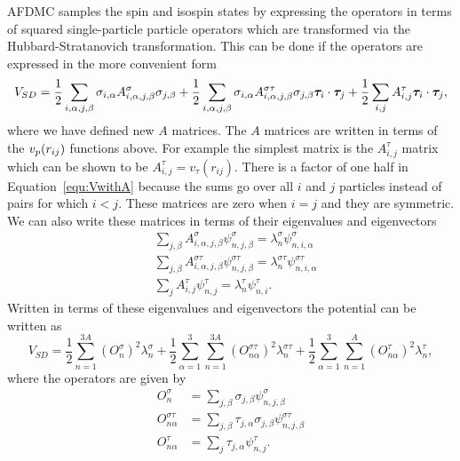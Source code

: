 AFDMC samples the spin and isospin states by expressing the operators in terms of squared single-particle particle operators which are transformed via the Hubbard-Stratanovich transformation. This can be done if the operators are expressed in the more convenient form
\begin{equation}
   V_{SD} = \frac{1}{2}\sum\limits_{i,\alpha,j,\beta} \sigma_{i,\alpha}A^{\sigma}_{i,\alpha,j,\beta}\sigma_{j,\beta}
      + \frac{1}{2}\sum\limits_{i,\alpha,j,\beta} \sigma_{i,\alpha}A^{\sigma\tau}_{i,\alpha,j,\beta}\sigma_{j,\beta}\bm{\tau}_i\cdot\bm{\tau}_j
      + \frac{1}{2}\sum\limits_{i,j} A^{\tau}_{i,j}\bm{\tau}_i\cdot\bm{\tau}_j,
   \label{equ:VwithA}
\end{equation}
where we have defined new $A$ matrices. The $A$ matrices are written in terms of the $v_p(r_{ij})$ functions above. For example the simplest matrix is the $A^{\tau}_{i,j}$ matrix which can be shown to be $A^{\tau}_{i,j} = v_{\tau}(r_{ij})$. There is a factor of one half in Equation~\ref{equ:VwithA} because the sums go over all $i$ and $j$ particles instead of pairs for which $i<j$. These matrices are zero when $i=j$ and they are symmetric. We can also write these matrices in terms of their eigenvalues and eigenvectors
\begin{align}
   &\sum\limits_{j,\beta} A^{\sigma}_{i,\alpha,j,\beta}\psi^{\sigma}_{n,j,\beta} = \lambda^{\sigma}_n\psi^{\sigma}_{n,i,\alpha} \\
   &\sum\limits_{j,\beta} A^{\sigma\tau}_{i,\alpha,j,\beta}\psi^{\sigma\tau}_{n,j,\beta} = \lambda^{\sigma\tau}_n\psi^{\sigma\tau}_{n,i,\alpha} \\
   &\sum\limits_{j} A^{\tau}_{i,j}\psi^{\tau}_{n,j} = \lambda^{\tau}_n\psi^{\tau}_{n,i}.
\end{align}
Written in terms of these eigenvalues and eigenvectors the potential can be written as
\begin{equation}
   V_{SD} = \frac{1}{2}\sum\limits_{n=1}^{3A} \left(O_{n}^{\sigma}\right)^2 \lambda_n^{\sigma}
      + \frac{1}{2}\sum\limits_{\alpha=1}^{3}\sum\limits_{n=1}^{3A} \left(O_{n\alpha}^{\sigma\tau}\right)^2 \lambda_n^{\sigma\tau}
      + \frac{1}{2}\sum\limits_{\alpha=1}^{3}\sum\limits_{n=1}^{A} \left(O_{n\alpha}^{\tau}\right)^2 \lambda_n^{\tau},
\end{equation}
where the operators are given by
\begin{equation}
\begin{split}
   O_{n}^{\sigma} &= \sum\limits_{j,\beta} \sigma_{j,\beta}\psi_{n,j,\beta}^{\sigma} \\
   O_{n\alpha}^{\sigma\tau} &= \sum\limits_{j,\beta} \tau_{j,\alpha}\sigma_{j,\beta}\psi_{n,j,\beta}^{\sigma\tau} \\
   O_{n\alpha}^{\tau} &= \sum\limits_{j} \tau_{j,\alpha}\psi_{n,j}^{\tau}.
\end{split}
\end{equation}
